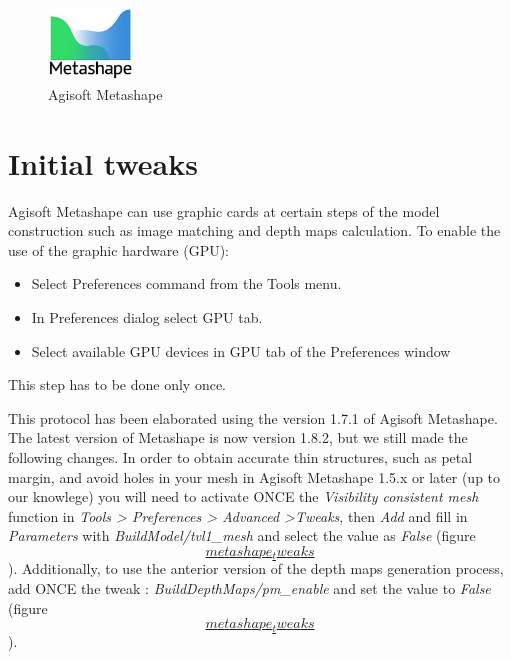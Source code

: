 \documentclass[
]{book}
\theoremstyle{definition}
\theoremstyle{definition}
\theoremstyle{definition}
\theoremstyle{definition}
\theoremstyle{remark}
\begin{document}
\begin{figure}
\centering
\includegraphics[width=0.2\textwidth,height=\textheight]{Figures/logo_metashape.jpeg}
\caption{Agisoft Metashape}
\end{figure}

\hypertarget{initial-tweaks}{%
\section{Initial tweaks}\label{initial-tweaks}}

Agisoft Metashape can use graphic cards at certain steps of the model
construction such as image matching and depth maps calculation. To
enable the use of the graphic hardware (GPU):

\begin{itemize}
\item
  Select Preferences command from the Tools menu.
\item
  In Preferences dialog select GPU tab.
\item
  Select available GPU devices in GPU tab of the Preferences window
\end{itemize}

This step has to be done only once.

This protocol has been elaborated using the version 1.7.1 of Agisoft
Metashape. The latest version of Metashape is now version 1.8.2, but we
still made the following changes. In order to obtain accurate thin
structures, such as petal margin, and avoid holes in your mesh in
Agisoft Metashape 1.5.x or later (up to our knowlege) you will need to
activate ONCE the \emph{Visibility consistent mesh} function in \emph{Tools \textgreater{}
Preferences \textgreater{} Advanced \textgreater Tweaks}, then \emph{Add} and fill in \emph{Parameters}
with \emph{BuildModel/tvl1\_mesh} and select the value as \emph{False} (figure
\protect\hyperlink{metashape_tweaks}{\[metashape_tweaks\]}). Additionally, to use the anterior
version of the depth maps generation process, add ONCE the tweak :
\emph{BuildDepthMaps/pm\_enable} and set the value to \emph{False} (figure
\protect\hyperlink{metashape_tweaks}{\[metashape_tweaks\]}).
\end{document}
